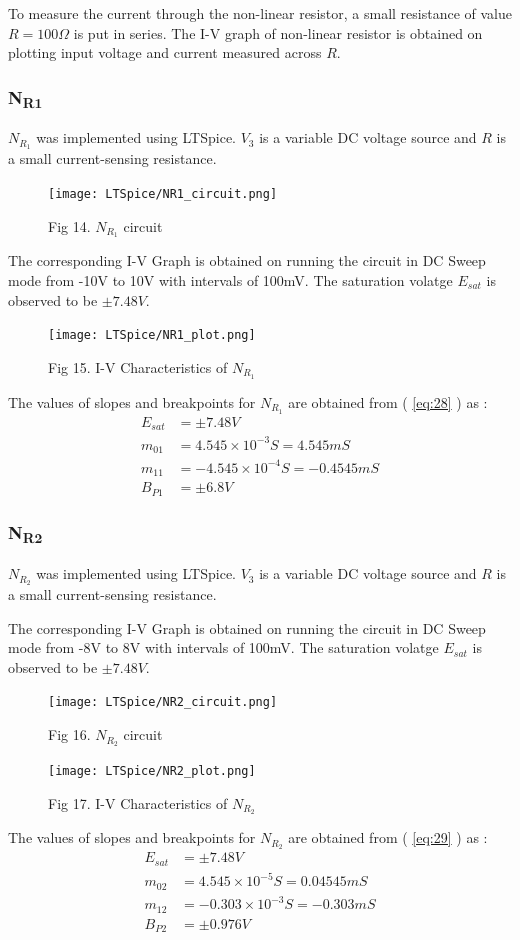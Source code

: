 \documentclass[12pt]{article}
\newcommand*{\myref}[1]{%
  \begingroup
    \hypersetup{
      linkcolor=linkequation,
      linkbordercolor=linkequation,
    }%
    \ref{#1}%
  \endgroup
}
\begin{document}
To measure the current through the non-linear resistor, a small resistance of value $R=100\Omega$ is put in series. The I-V graph of non-linear resistor is obtained on plotting input voltage and current measured across $R$. 
%
\subsubsection{N\textsubscript{R1}}
$N_{R_1}$ was implemented using LTSpice. $V_3$ is a variable DC voltage source and $R$ is a small current-sensing resistance.
\begin{figure}[H]
	\centering
	\texttt{[image: LTSpice/NR1\_circuit.png]}
	\caption{Fig 14. $N_{R_1}$ circuit}
\end{figure}
The corresponding I-V Graph is obtained on running the circuit in DC Sweep mode from -10V to 10V with intervals of 100mV. The saturation volatge $E_{sat}$ is observed to be $\pm 7.48V$.
\begin{figure}[H]
	\centering
	\texttt{[image: LTSpice/NR1\_plot.png]}
	\caption{Fig 15. I-V Characteristics of $N_{R_1}$}
\end{figure}

The values of slopes and breakpoints for $N_{R_1}$ are obtained from (\myref{eq:28}) as :
\begin{align*}
	E_{sat}&=\pm 7.48V \\
	m_{01}&=4.545\times 10^{-3} S = 4.545 mS \\ 
	m_{11}&= -4.545\times 10^{-4} S = -0.4545 mS \\
	B_{P1}&= \pm 6.8V 
\end{align*}
%
\subsubsection{N\textsubscript{R2}}
$N_{R_2}$ was implemented using LTSpice. $V_3$ is a variable DC voltage source and $R$ is a small current-sensing resistance. \linebreak

The corresponding I-V Graph is obtained on running the circuit in DC Sweep mode from -8V to 8V with intervals of 100mV. The saturation volatge $E_{sat}$ is observed to be $\pm 7.48V$.
\begin{figure}[H]
	\centering
	\texttt{[image: LTSpice/NR2\_circuit.png]}
	\caption{Fig 16. $N_{R_2}$ circuit}
\end{figure}
\begin{figure}[H]
	\centering
	\texttt{[image: LTSpice/NR2\_plot.png]}
	\caption{Fig 17. I-V Characteristics of $N_{R_2}$}
\end{figure}
The values of slopes and breakpoints for $N_{R_2}$ are obtained from (\myref{eq:29}) as :
\begin{align*}
	E_{sat}&= \pm 7.48V \\
	m_{02}&=4.545\times 10^{-5}S = 0.04545 mS \\
	m_{12}&=-0.303\times 10^{-3}S = -0.303 mS \\
	B_{P2}&= \pm 0.976V
\end{align*}
\end{document}
